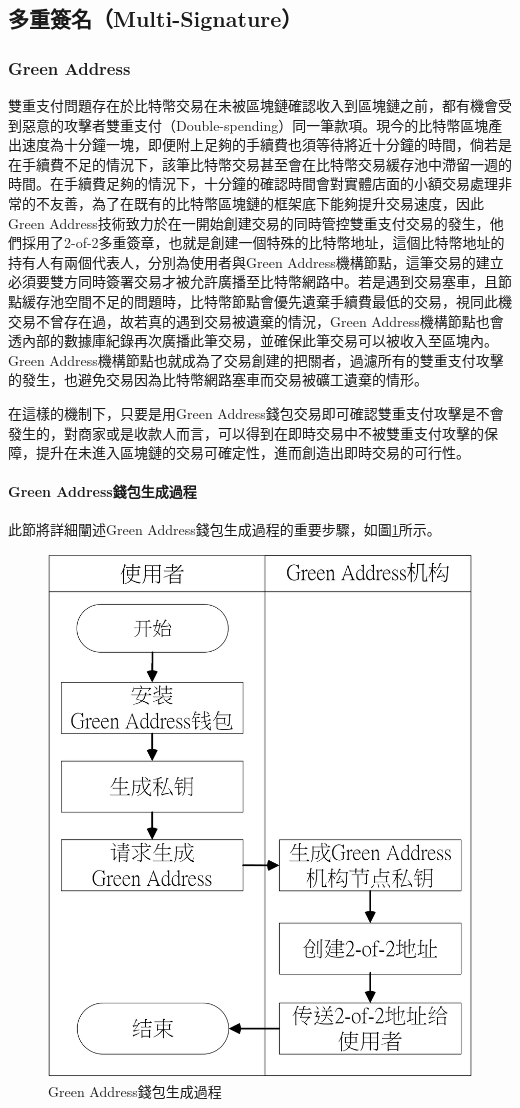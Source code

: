 		\subsection{多重簽名（Multi-Signature）}
		 	\subsubsection{Green Address}
		 	雙重支付問題存在於比特幣交易在未被區塊鏈確認收入到區塊鏈之前，都有機會受到惡意的攻擊者雙重支付（Double-spending）\supercite{Informationpropagationinthebitcoinnetwork}同一筆款項。現今的比特幣區塊產出速度為十分鐘一塊，即便附上足夠的手續費也須等待將近十分鐘的時間，倘若是在手續費不足的情況下，該筆比特幣交易甚至會在比特幣交易緩存池中滯留一週的時間。在手續費足夠的情況下，十分鐘的確認時間會對實體店面的小額交易處理非常的不友善，為了在既有的比特幣區塊鏈的框架底下能夠提升交易速度，因此Green Address技術致力於在一開始創建交易的同時管控雙重支付交易的發生，他們採用了2-of-2多重簽章，也就是創建一個特殊的比特幣地址，這個比特幣地址的持有人有兩個代表人，分別為使用者與Green Address機構節點，這筆交易的建立必須要雙方同時簽署交易才被允許廣播至比特幣網路中。若是遇到交易塞車，且節點緩存池空間不足的問題時，比特幣節點會優先遺棄手續費最低的交易，視同此機交易不曾存在過，故若真的遇到交易被遺棄的情況，Green Address機構節點也會透內部的數據庫紀錄再次廣播此筆交易，並確保此筆交易可以被收入至區塊內。Green Address機構節點也就成為了交易創建的把關者，過濾所有的雙重支付攻擊的發生，也避免交易因為比特幣網路塞車而交易被礦工遺棄的情形。

		 	在這樣的機制下，只要是用Green Address錢包交易即可確認雙重支付攻擊是不會發生的，對商家或是收款人而言，可以得到在即時交易中不被雙重支付攻擊的保障，提升在未進入區塊鏈的交易可確定性，進而創造出即時交易的可行性。

		 	\paragraph{Green Address錢包生成過程}
		 	此節將詳細闡述Green Address錢包生成過程的重要步驟，如圖\ref{gabuild}所示。
		 	\begin{figure}[h]
				\centering
				\includegraphics[width = .5\textwidth]{gabuild.png}
				\caption{Green Address錢包生成過程}\label{gabuild}
			\end{figure}


